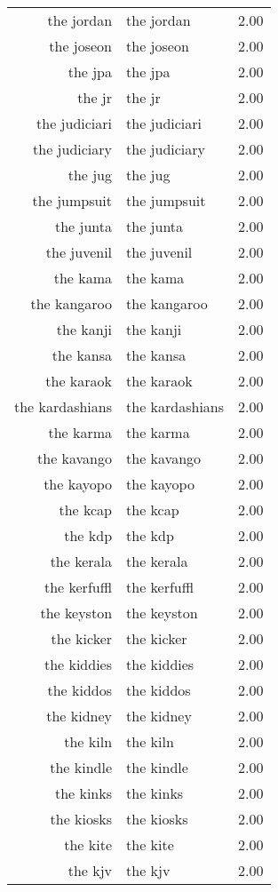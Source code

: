 \begin{table}[ht]
\begin{tabular}{rlr}
  the jordan & the jordan & 2.00 \\ 
  the joseon & the joseon & 2.00 \\ 
  the jpa & the jpa & 2.00 \\ 
  the jr & the jr & 2.00 \\ 
  the judiciari & the judiciari & 2.00 \\ 
  the judiciary & the judiciary & 2.00 \\ 
  the jug & the jug & 2.00 \\ 
  the jumpsuit & the jumpsuit & 2.00 \\ 
  the junta & the junta & 2.00 \\ 
  the juvenil & the juvenil & 2.00 \\ 
  the kama & the kama & 2.00 \\ 
  the kangaroo & the kangaroo & 2.00 \\ 
  the kanji & the kanji & 2.00 \\ 
  the kansa & the kansa & 2.00 \\ 
  the karaok & the karaok & 2.00 \\ 
  the kardashians & the kardashians & 2.00 \\ 
  the karma & the karma & 2.00 \\ 
  the kavango & the kavango & 2.00 \\ 
  the kayopo & the kayopo & 2.00 \\ 
  the kcap & the kcap & 2.00 \\ 
  the kdp & the kdp & 2.00 \\ 
  the kerala & the kerala & 2.00 \\ 
  the kerfuffl & the kerfuffl & 2.00 \\ 
  the keyston & the keyston & 2.00 \\ 
  the kicker & the kicker & 2.00 \\ 
  the kiddies & the kiddies & 2.00 \\ 
  the kiddos & the kiddos & 2.00 \\ 
  the kidney & the kidney & 2.00 \\ 
  the kiln & the kiln & 2.00 \\ 
  the kindle & the kindle & 2.00 \\ 
  the kinks & the kinks & 2.00 \\ 
  the kiosks & the kiosks & 2.00 \\ 
  the kite & the kite & 2.00 \\ 
  the kjv & the kjv & 2.00 \\ 

\end{tabular}
\end{table}
